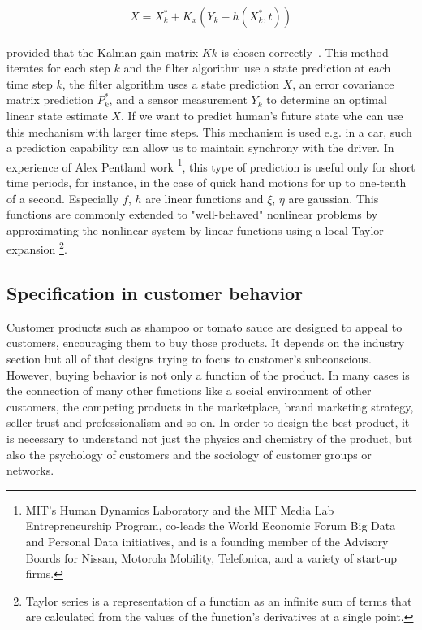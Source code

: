 \begin{equation} \label{eq:3}
X = X_{k}^{*} + K_x(Y_k - h(X_{k}^{*},t))
\end{equation}
\\
provided that the Kalman gain matrix $Kk$ is chosen correctly~\cite{kalman}.
This method iterates for each step $k$ and the filter algorithm use a state prediction at each time step $k$,
the filter algorithm uses a state prediction $X$, an error covariance matrix prediction $P_k^*$,
and a sensor measurement $Y_k$ to determine an optimal linear state estimate $X$.
If we want to predict human's future state whe can use this mechanism with larger time steps.
This mechanism is used e.g. in a car, such a prediction capability can allow us to maintain synchrony with the driver.
In experience of Alex Pentland work \footnote{MIT's Human Dynamics Laboratory and the MIT Media Lab Entrepreneurship
Program, co-leads the World Economic Forum Big Data and Personal Data initiatives, and is a founding member
of the Advisory Boards for Nissan, Motorola Mobility, Telefonica, and a variety of start-up firms.}, this type of prediction
is useful only for short time periods, for instance, in the case of quick hand motions for up to one-tenth of a second.
Especially $f$, $h$ are linear functions and $\xi$, $\eta$ are gaussian.
This functions are commonly extended to "well-behaved" nonlinear problems by approximating the nonlinear system by linear functions
using a local Taylor expansion \footnote{Taylor series is a representation of a function as an infinite sum of terms that are calculated from
the values of the function's derivatives at a single point.}.

\subsection{Specification in customer behavior} \label{subsec:specification}
Customer products such as shampoo or tomato sauce are designed to appeal to customers, encouraging them to buy those products.
It depends on the industry section but all of that designs trying to focus to customer's subconscious.
However, buying behavior is not only a function of the product.
In many cases is the connection of many other functions like a social environment of other customers, the competing
products in the marketplace, brand marketing strategy, seller trust and professionalism and so on.
In order to design the best product, it is necessary to understand not just the physics and chemistry of the product,
but also the psychology of customers and the sociology of customer groups or networks.\cite{patel}

